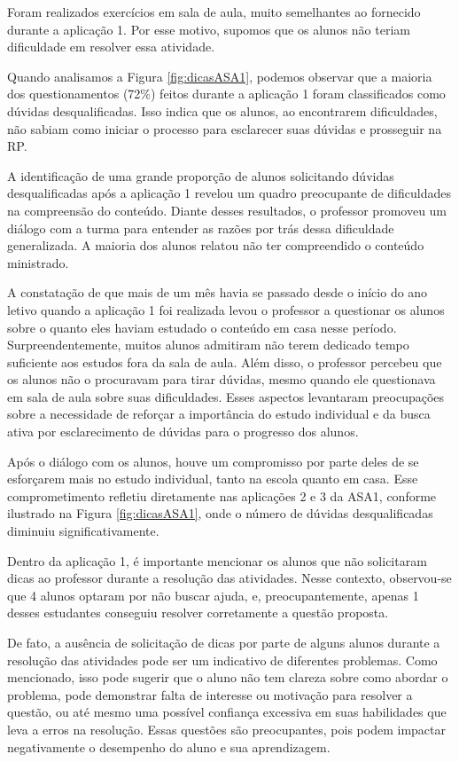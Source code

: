 Foram realizados exercícios em sala de aula, muito semelhantes ao fornecido durante a  aplicação 1. Por esse motivo, supomos que os alunos não teriam dificuldade em resolver essa atividade.

Quando analisamos a Figura \ref{fig:dicasASA1}, podemos observar que a maioria dos questionamentos (72\%) feitos durante a aplicação 1 foram classificados como dúvidas desqualificadas. Isso indica que os alunos, ao encontrarem dificuldades, não sabiam como iniciar o processo para esclarecer suas dúvidas e prosseguir na RP.

A identificação de uma grande proporção de alunos solicitando dúvidas desqualificadas após a aplicação 1 revelou um quadro preocupante de dificuldades na compreensão do conteúdo. Diante desses resultados, o professor promoveu um diálogo com a turma para entender as razões por trás dessa dificuldade generalizada. A maioria dos alunos relatou não ter compreendido o conteúdo ministrado.

A constatação de que mais de um mês havia se passado desde o início do ano letivo quando a aplicação 1 foi realizada levou o professor a questionar os alunos sobre o quanto eles haviam estudado o conteúdo em casa nesse período. Surpreendentemente, muitos alunos admitiram não terem dedicado tempo suficiente aos estudos fora da sala de aula. Além disso, o professor percebeu que os alunos não o procuravam para tirar dúvidas, mesmo quando ele questionava em sala de aula sobre suas dificuldades. Esses aspectos levantaram preocupações sobre a necessidade de reforçar a importância do estudo individual e da busca ativa por esclarecimento de dúvidas para o progresso dos alunos.

Após o diálogo com os alunos, houve um compromisso por parte deles de se esforçarem mais no estudo individual, tanto na escola quanto em casa. Esse comprometimento refletiu diretamente nas aplicações 2 e 3 da ASA1, conforme ilustrado na Figura \ref{fig:dicasASA1}, onde o número de dúvidas desqualificadas diminuiu significativamente.

Dentro da aplicação 1, é importante mencionar os alunos que não solicitaram dicas ao professor durante a resolução das atividades. Nesse contexto, observou-se que 4 alunos optaram por não buscar ajuda, e, preocupantemente, apenas 1 desses estudantes conseguiu resolver corretamente a questão proposta.

De fato, a ausência de solicitação de dicas por parte de alguns alunos durante a resolução das atividades pode ser um indicativo de diferentes problemas. Como mencionado, isso pode sugerir que o aluno não tem clareza sobre como abordar o problema, pode demonstrar falta de interesse ou motivação para resolver a questão, ou até mesmo uma possível confiança excessiva em suas habilidades que leva a erros na resolução. Essas questões são preocupantes, pois podem impactar negativamente o desempenho do aluno e sua aprendizagem. 

